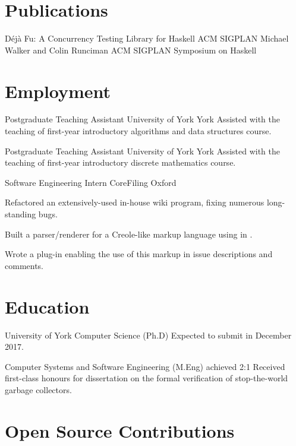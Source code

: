 \documentclass[a4paper]{cv}
\begin{document}
\section{Publications}

  {Déjà Fu: A Concurrency Testing Library for Haskell}
  {ACM SIGPLAN}
  {Michael Walker and Colin Runciman}
  {ACM SIGPLAN Symposium on Haskell}

\section{Employment}

  {Postgraduate Teaching Assistant}
  {University of York}
  {York}
  {Assisted with the teaching of first-year introductory algorithms and
    data structures course.}

  {Postgraduate Teaching Assistant}
  {University of York}
  {York}
  {Assisted with the teaching of first-year introductory discrete mathematics course.}

  {Software Engineering Intern}
  {CoreFiling}
  {Oxford}
  {\begin{tightitemize}
    \item Refactored an extensively-used in-house wiki program, fixing
      numerous long-standing bugs.
    \item Built a parser/renderer for a Creole-like markup language
      using  in .
    \item Wrote a  plug-in enabling the use of this
      markup in issue descriptions and comments.
    \end{tightitemize}}

\section{Education}

\begin{educated}{University of York}
  {Computer Science (Ph.D)}
  {}
  {Expected to submit in December 2017.}

  {Computer Systems and Software Engineering (M.Eng)}
  {achieved 2:1}
  {Received first-class honours for dissertation on the formal
    verification of stop-the-world garbage collectors.}
\end{educated}

\section{Open Source Contributions}
\end{document}

